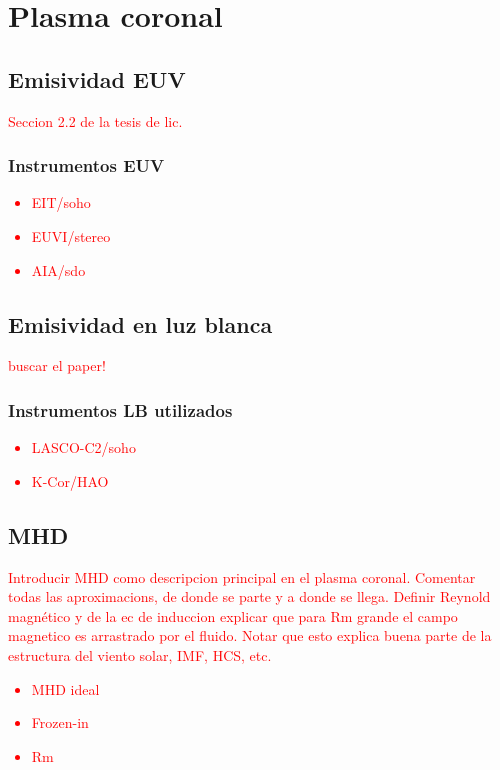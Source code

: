 \chapter{Plasma coronal}

\section{Emisividad EUV}
\textcolor{red}{Seccion 2.2 de la tesis de lic.}
\subsection{Instrumentos EUV}
\textcolor{red}{
\begin{itemize}
  \item EIT/soho
  \item EUVI/stereo
  \item AIA/sdo
\end{itemize}
}
\section{Emisividad en luz blanca}
\textcolor{red}{buscar el paper!}
\subsection{Instrumentos LB utilizados}
\textcolor{red}{
\begin{itemize}
  \item LASCO-C2/soho
  \item K-Cor/HAO
\end{itemize}
}

\section{MHD}
\textcolor{red}{Introducir MHD como descripcion principal en el plasma coronal. Comentar todas las aproximacions, de donde se parte y a donde se llega. Definir Reynold magnético y de la ec de induccion explicar que para Rm grande el campo magnetico es arrastrado por el fluido. Notar que esto explica buena parte de la estructura del viento solar, IMF, HCS, etc.
\begin{itemize}
  \item MHD ideal
  \item Frozen-in
  \item Rm
\end{itemize}
}

